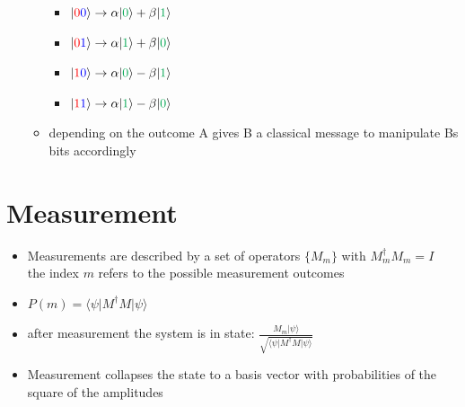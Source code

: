 \documentclass[12pt,a4paper]{article}
\newcommand{\ecb}[1]{\{#1\}}
\newcommand{\ket}[1]{\vert #1 \rangle}
\newcommand{\tek}[1]{\langle #1 \vert}
\newcommand{\red}[1]{\textcolor{red} {#1}}
\newcommand{\blue}[1]{\textcolor{blue} {#1}}
\newcommand{\green}[1]{\textcolor{Green} {#1}}
\begin{document}
\begin{itemize}
\begin{itemize}
\begin{itemize}
\item $\ket{\red{0}\blue{0}} \rightarrow \alpha \ket{\green{0}}+\beta\ket{\green{1}}$
\item $\ket{\red{0}\blue{1}} \rightarrow \alpha \ket{\green{1}}+\beta\ket{\green{0}}$
\item $\ket{\red{1}\blue{0}} \rightarrow \alpha \ket{\green{0}}-\beta\ket{\green{1}}$
\item $\ket{\red{1}\blue{1}} \rightarrow \alpha \ket{\green{1}}-\beta\ket{\green{0}}$
\end{itemize}
\item depending on the outcome A gives B a classical message to manipulate Bs bits accordingly
\end{itemize} 
\end{itemize}

\section{Measurement}
\begin{itemize}
\item Measurements are described by a set of operators $\ecb{M_m}$ with $M_m^\dagger M_m = I$\\the index $m$ refers to the possible measurement outcomes
\item $P(m) = \tek{\psi}M^\dagger M \ket{\psi}$
\item after measurement the system is in state: $\displaystyle \frac{M_m\ket{\psi}}{\sqrt{\tek{\psi}M^\dagger M\ket{\psi}}}$
\item Measurement collapses the state to a basis vector with probabilities of the square of the amplitudes
\end{itemize}
\end{document}
